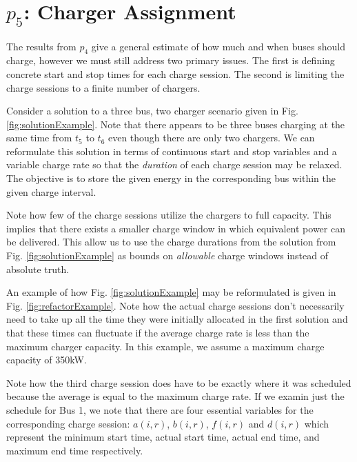 



\section{$p_5$: Charger Assignment\label{sec:chargerAssignment}}
The results from $p_4$ give a general estimate of how much and when buses should charge, however we must still address two primary issues. The first is defining concrete start and stop times for each charge session. The second is limiting the charge sessions to a finite number of chargers. 
\par Consider a solution to a three bus, two charger scenario given in Fig. \ref{fig:solutionExample}.
Note that there appears to be three buses charging at the same time from $t_5$ to $t_6$ even though there are only two chargers.  We can reformulate this solution in terms of continuous start and stop variables and a variable charge rate so that the {\it duration} of each charge session may be relaxed. The objective is to store the given energy in the corresponding bus within the given charge interval.  
\par Note how few of the charge sessions utilize the chargers to full capacity. This implies that there exists a smaller charge window in which equivalent power can be delivered. This allow us to use the charge durations from the solution from Fig. \ref{fig:solutionExample} as bounds on {\it allowable} charge windows instead of absolute truth. 
\par An example of how Fig. \ref{fig:solutionExample} may be reformulated is given in Fig. \ref{fig:refactorExample}. Note how the actual charge sessions don't necessarily need to take up all the time they were initially allocated in the first solution and that these times can fluctuate if the average charge rate is less than the maximum charger capacity. In this example, we assume a maximum charge capacity of 350kW.  
\par Note how the third charge session does have to be exactly where it was scheduled because the average is equal to the maximum charge rate.
If we examin just the schedule for Bus 1, we note that there are four essential variables for the corresponding charge session: $a(i,r)$, $b(i,r)$, $f(i,r)$ and $d(i,r)$ which represent the minimum start time, actual start time, actual end time, and maximum end time respectively. 

